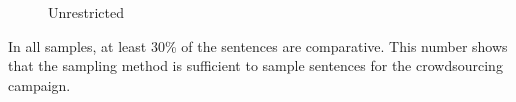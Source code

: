     \begin{figure}[h]
    \centering
    \begin{minipage}{0.49\textwidth}
        \centering
               \caption{Unrestricted}
    \end{minipage}\hfill
    \end{figure}
    
In all samples, at least 30\% of the sentences are comparative. This number shows that the sampling method is sufficient to sample sentences for the crowdsourcing campaign.
